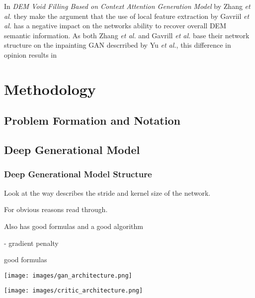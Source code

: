 \documentclass[twocolumn]{article}
\begin{document}
\autocite{gavriilVoidFillingDigital2019}

In \emph{DEM Void Filling Based on Context Attention Generation Model} by Zhang \emph{et al.}\autocite{zhangVoidFillingBased2020} they make the argument that the use of local feature extraction by Gavriil \emph{et al.}\autocite{gavriilVoidFillingDigital2019} has a negative impact on the networks ability to recover overall DEM semantic information.
As both Zhang \emph{et al.} and Gavrill \emph{et al.} base their network structure on the inpainting GAN descrribed by Yu \emph{et al.}\autocite{yuGenerativeImageInpainting2018}, this difference in opinion results in  

\autocite{dongFillingVoidsElevation2020}

\autocite{qiuVoidFillingDigital2019}


\section{Methodology}
\label{sec:org4e94d61}
\subsection{Problem Formation and Notation}
\label{sec:orgcf021a8}
\subsection{Deep Generational Model}
\label{sec:org9be6ea3}
\subsubsection{Deep Generational Model Structure}
\label{sec:org9b9c6fe}
Look at the way\autocite{zhangVoidFillingBased2020} describes the stride and kernel size of the network.

For obvious reasons read through\autocite{yuGenerativeImageInpainting2018}.

Also has good formulas and a good algorithm

\autocite{gulrajaniImprovedTrainingWasserstein2017} - gradient penalty

\autocite{qiuVoidFillingDigital2019} good formulas

\begin{figure*}
\centering
\texttt{[image: images/gan\_architecture.png]}
\end{figure*}

\begin{figure*}
\centering
\texttt{[image: images/critic\_architecture.png]}
\end{figure*}
\end{document}
